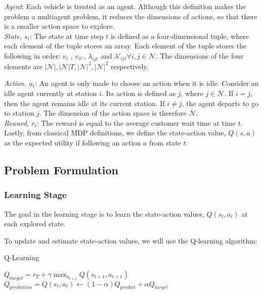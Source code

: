 \documentclass[letterpaper, 10 pt, conference]{ieeeconf}  %
\begin{document}
\noindent \textit{Agent}: Each vehicle is treated as an agent. Although this definition makes the problem a multiagent problem, it reduces the dimensions of actions, so that there is a smaller action space to explore. \\

\noindent \textit{State, $s_t$}: The state at time step $t$ is defined as a four-dimensional tuple, where each element of the tuple stores an array. Each element of the tuple stores the following in order: $v_i$ , $v_{it'}$, $\lambda_{ijt}$ and $\lambda'_{ijt} \forall i,j\in\mathcal{N}$. The dimensions of the four elements are $|\mathcal{N}|,|\mathcal{N}|T,|\mathcal{N}|^2,|\mathcal{N}|^2$ respectively.

\noindent \textit{Action, $a_t$}: An agent is only made to choose an action when it is idle. Consider an idle agent currently at station $i$. Its action is defined as $j$, where $j\in \mathcal{N}$. If $i = j$, then the agent remains idle at its current station. If $i \neq j$, the agent departs to go to station $j$. The dimension of the action space is therefore $\mathcal{N}$. \\

\noindent \textit{Reward, $r_t$}: The reward is equal to the average customer wait time at time $t$. \\ 

Lastly, from classical MDP definitions, we define the state-action value, $Q(s,a)$ as the expected utility if following an action $a$ from state $t$.

\subsection{Problem Formulation}
\subsubsection{Learning Stage}
The goal in the learning stage is to learn the state-action values, $Q(s_t,a_t)$ at each explored state.

To update and estimate state-action values, we will use the Q-learning algorithm:
\begin{algorithm}[H]
\caption{Q-Learning}
\begin{algorithmic}
    \State $Q_{target} = r_T+\gamma \max_{a_{t+1}} Q(s_{t+1},a_{t+1})$
    \State $Q_{prediction} = Q(s_t,a_t) \leftarrow (1-\alpha)Q_{predict}+\alpha Q_{target}$
\EndFor
\end{algorithmic}
\end{algorithm}
\end{document}
